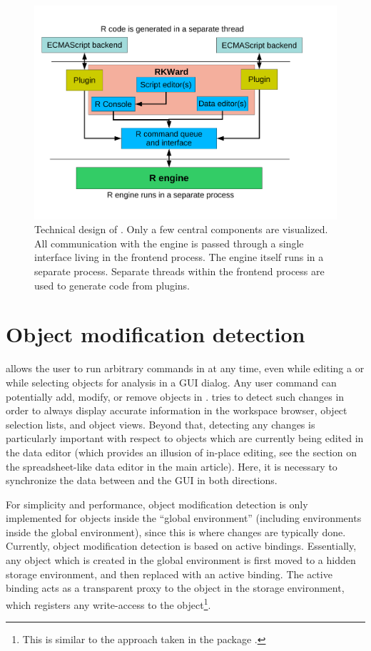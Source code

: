\begin{figure}[t!]
 \centering
 \includegraphics[clip=true,trim=0cm 2cm 0cm 0cm]{./figures/design_sketch.pdf}
 \caption{Technical design of . Only a few central components are visualized.
 All communication with the  engine is passed through a single interface living in the frontend process. The  engine itself
 runs in a separate process. 
 Separate threads within the frontend process are used to generate  code from plugins.
}
 \label{fig:design_sketch}
\end{figure}

\section{Object modification detection}
\label{sec:technical_omd}
 allows the user to run arbitrary commands in  at any time, even while
editing a  or while selecting objects for analysis in a GUI dialog. Any user
command can potentially add, modify, or remove objects in .  tries to
detect such changes in order to always display accurate information in the
workspace browser, object selection lists, and object views. Beyond that,
detecting any changes is particularly important with respect to objects which
are currently being edited in the data editor (which provides an illusion
of in-place editing, see the section on the spreadsheet-like data editor in the
main article). Here, it is necessary to synchronize
the data between  and the GUI in both directions.

For simplicity and performance, object modification detection is only
implemented for objects inside the ``global environment'' (including environments
inside the global environment), since this is where changes are typically done.
Currently, object modification detection is based on active bindings.
Essentially, any object which is created in the global environment is first
moved to a hidden storage environment, and then replaced with an active binding.
The active binding acts as a transparent proxy to the object in the storage
environment, which registers any write-access to the object\footnote{
    This is similar to the approach taken in the  package \citep{Plate2009}.
}.

